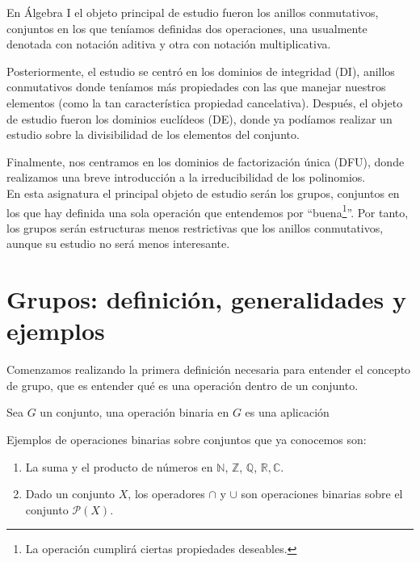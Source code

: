 En Álgebra I el objeto principal de estudio fueron los anillos conmutativos, conjuntos en los que teníamos definidas dos operaciones, una usualmente denotada con notación aditiva y otra con notación multiplicativa.

Posteriormente, el estudio se centró en los dominios de integridad (DI), anillos conmutativos donde teníamos más propiedades con las que manejar nuestros elementos (como la tan característica propiedad cancelativa). Después, el objeto de estudio fueron los dominios euclídeos (DE), donde ya podíamos realizar un estudio sobre la divisibilidad de los elementos del conjunto.

Finalmente, nos centramos en los dominios de factorización única (DFU), donde realizamos una breve introducción a la irreducibilidad de los polinomios.\\

En esta asignatura el principal objeto de estudio serán los grupos, conjuntos en los que hay definida una sola operación que entendemos por ``buena\footnote{La operación cumplirá ciertas propiedades deseables.}''. Por tanto, los grupos serán estructuras menos restrictivas que los anillos conmutativos, aunque su estudio no será menos interesante.

\chapter{Grupos: definición, generalidades y ejemplos}\label{cap:1}
Comenzamos realizando la primera definición necesaria para entender el concepto de grupo, que es entender qué es una operación dentro de un conjunto.

\begin{definicion}
    Sea $G$ un conjunto, una operación binaria en $G$ es una aplicación
\end{definicion}

\begin{ejemplo}
    Ejemplos de operaciones binarias sobre conjuntos que ya conocemos son:
    \begin{enumerate}
        \item La suma y el producto de números en $\mathbb{N}$, $\mathbb{Z}$, $\mathbb{Q}$, $\mathbb{R}, \mathbb{C}$.
        \item Dado un conjunto $X$, los operadores $\cap$ y $\cup$ son operaciones binarias sobre el conjunto $\mathcal{P}(X)$.
    \end{enumerate}
\end{ejemplo}

